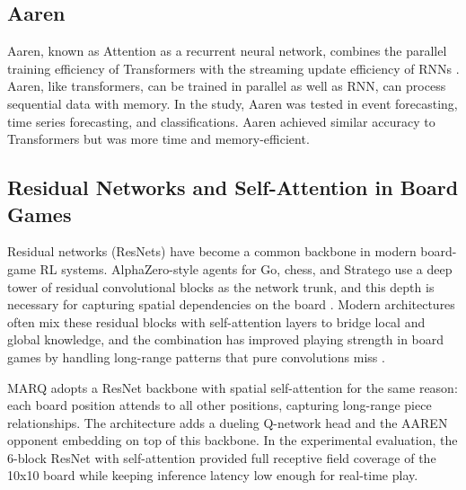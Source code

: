 \subsection{Aaren}
Aaren, known as Attention as a recurrent neural network, combines the parallel training efficiency of Transformers with the streaming update efficiency of RNNs \cite{Aaren}. Aaren, like transformers, can be trained in parallel as well as RNN, can process sequential data with memory. In the study, Aaren was tested in event forecasting, time series forecasting, and classifications. Aaren achieved similar accuracy to Transformers but was more time and memory-efficient.

\subsection{Residual Networks and Self-Attention in Board Games}
Residual networks (ResNets) have become a common backbone in modern board-game RL systems. AlphaZero-style agents for Go, chess, and Stratego use a deep tower of residual convolutional blocks as the network trunk, and this depth is necessary for capturing spatial dependencies on the board \cite{AlphaStratego}. Modern architectures often mix these residual blocks with self-attention layers to bridge local and global knowledge, and the combination has improved playing strength in board games by handling long-range patterns that pure convolutions miss \cite{restnet2025board}.

MARQ adopts a ResNet backbone with spatial self-attention for the same reason: each board position attends to all other positions, capturing long-range piece relationships. The architecture adds a dueling Q-network head and the AAREN opponent embedding on top of this backbone. In the experimental evaluation, the 6-block ResNet with self-attention provided full receptive field coverage of the 10x10 board while keeping inference latency low enough for real-time play.


